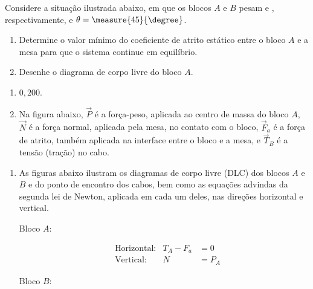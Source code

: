 \begin{question}
	Considere a situação ilustrada abaixo, em que os blocos $A$ e $B$ pesam  e , respectivamente, e $\theta = \measure{45}{\degree}$.


	\begin{enumerate}
		\item Determine o valor mínimo do coeficiente de atrito estático entre o bloco $A$ e a mesa para que o sistema continue em equilíbrio.
		\item Desenhe o diagrama de corpo livre do bloco $A$.
	\end{enumerate}

	\begin{answer}
		\begin{enumerate}
			\item $0,200$.
			\item Na figura abaixo, $\vec P$ é a força-peso, aplicada ao centro de massa do bloco $A$, $\vec N$ é a força normal, aplicada pela mesa, no contato com o bloco, $\vec F_a$ é a força de atrito, também aplicada na interface entre o bloco e a mesa, e $\vec T_B$ é a tensão (tração) no cabo.
		\end{enumerate}
	\end{answer}

	\begin{solution}
		\begin{enumerate}
			\item As figuras abaixo ilustram os diagramas de corpo livre (DLC) dos blocos $A$ e $B$ e do ponto de encontro dos cabos, bem como as equações advindas da segunda lei de Newton, aplicada em cada um deles, nas direções horizontal e vertical.

			\bigskip

			\begin{minipage}[t]{0.3\textwidth}
				\noindent
				Bloco $A$:


				\begin{align}
					&\text{Horizontal:}& T_A - F_a &= 0 \label{eq:Ax}\\
					&\text{Vertical:}& N &= P_A \label{eq:Ay}
				\end{align}
			\end{minipage}\hfill
			\begin{minipage}[t]{0.3\textwidth}
				\noindent
				Bloco $B$:


\end{minipage}
\end{enumerate}
\end{solution}
\end{question}

